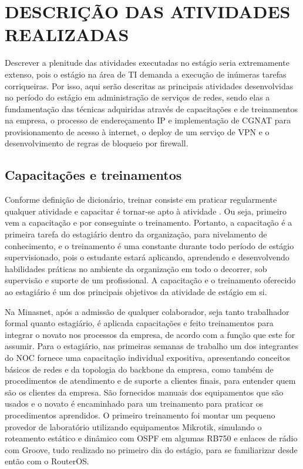 \chapter{DESCRIÇÃO DAS ATIVIDADES REALIZADAS}

    Descrever a plenitude das atividades executadas no estágio seria extremamente extenso, pois o estágio na área de TI demanda a execução de inúmeras tarefas corriqueiras. Por isso, aqui serão descritas as principais atividades desenvolvidas no período do estágio em administração de serviços de redes, sendo elas a fundamentação das técnicas adquiridas através de capacitações e de treinamentos na empresa, o processo de endereçamento IP e implementação de CGNAT para provisionamento de acesso à internet, o deploy de um serviço de VPN e o desenvolvimento de regras de bloqueio por firewall. 

\section{Capacitações e treinamentos}

    Conforme definição de dicionário, treinar consiste em praticar regularmente qualquer atividade e capacitar é tornar-se apto à atividade \cite{michaelis2015}. Ou seja, primeiro vem a capacitação e por conseguinte o treinamento. Portanto, a capacitação é a primeira tarefa do estagiário dentro da organização, para nivelamento de conhecimento, e o treinamento é uma constante durante todo período de estágio supervisionado, pois o estudante estará aplicando, aprendendo e desenvolvendo habilidades práticas no ambiente da organização em todo o decorrer, sob supervisão e suporte de um profissional. A capacitação e o treinamento oferecido ao estagiário é um dos principais objetivos da atividade de estágio em si.
    
    Na Minasnet, após a admissão de qualquer colaborador, seja tanto trabalhador formal quanto estagiário, é aplicada capacitações e feito treinamentos para integrar o novato nos processos da empresa, de acordo com a função que este for assumir. Para o estagiário, nas primeiras semanas de trabalho um dos integrantes do NOC fornece uma capacitação individual expositiva, apresentando conceitos básicos de redes e da topologia do backbone da empresa, como também de procedimentos de atendimento e de suporte a clientes finais, para entender quem são os clientes da empresa. São fornecidos manuais dos equipamentos que são usados e o novato é encaminhado para um treinamento para praticar os procedimentos aprendidos. O primeiro treinamento foi montar um pequeno provedor de laboratório utilizando equipamentos Mikrotik, simulando o roteamento estático e dinâmico com OSPF em algumas RB750 e enlaces de rádio com Groove, tudo realizado no primeiro dia do estágio, para se familiarizar desde então com o RouterOS.
    
